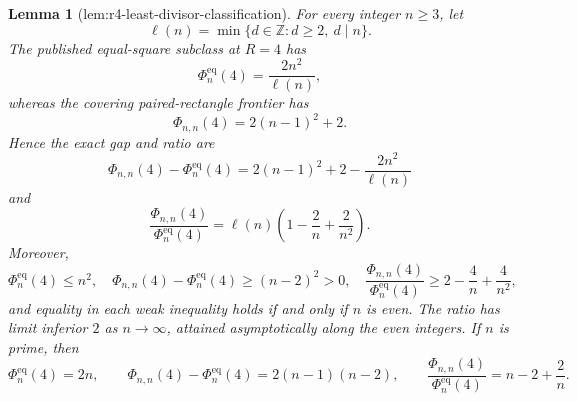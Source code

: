 \documentclass{article}
\newtheorem{lemma}{Lemma}
\begin{document}
\begin{lemma}[lem:r4-least-divisor-classification]\label{lem:r4-least-divisor-classification}
For every integer \(n\ge3\), let
\[
\ell(n)=\min\{d\in\mathbb Z:d\ge2,\ d\mid n\}.
\]
The published equal-square subclass at \(R=4\) has
\[
\Phi_n^{\mathrm{eq}}(4)=\frac{2n^2}{\ell(n)},
\]
whereas the covering paired-rectangle frontier has
\[
\Phi_{n,n}(4)=2(n-1)^2+2.
\]
Hence the exact gap and ratio are
\[
\Phi_{n,n}(4)-\Phi_n^{\mathrm{eq}}(4)
=2(n-1)^2+2-\frac{2n^2}{\ell(n)}
\]
and
\[
\frac{\Phi_{n,n}(4)}{\Phi_n^{\mathrm{eq}}(4)}
=\ell(n)\left(1-\frac2n+\frac{2}{n^2}\right).
\]
Moreover,
\[
\Phi_n^{\mathrm{eq}}(4)\le n^2,
\quad
\Phi_{n,n}(4)-\Phi_n^{\mathrm{eq}}(4)\ge(n-2)^2>0,
\quad
\frac{\Phi_{n,n}(4)}{\Phi_n^{\mathrm{eq}}(4)}
\ge2-\frac4n+\frac4{n^2},
\]
and equality in each weak inequality holds if and only if \(n\) is even. The ratio has limit inferior \(2\) as \(n\to\infty\), attained asymptotically along the even integers. If \(n\) is prime, then
\[
\Phi_n^{\mathrm{eq}}(4)=2n,
\qquad
\Phi_{n,n}(4)-\Phi_n^{\mathrm{eq}}(4)=2(n-1)(n-2),
\qquad
\frac{\Phi_{n,n}(4)}{\Phi_n^{\mathrm{eq}}(4)}=n-2+\frac2n.
\]
\end{lemma}
\end{document}
